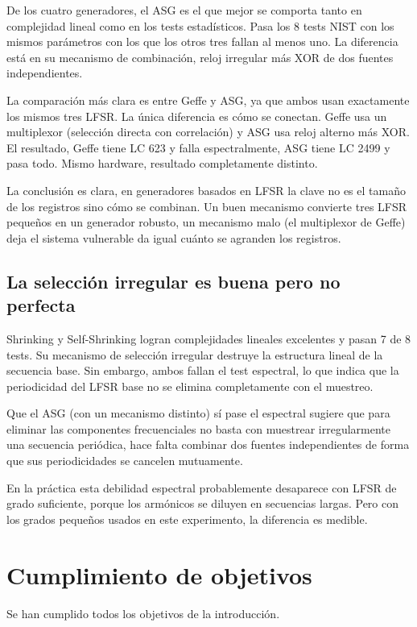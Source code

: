 De los cuatro generadores, el ASG es el que mejor se comporta tanto en complejidad lineal como en los tests estadísticos.
Pasa los 8 tests NIST con los mismos parámetros con los que los otros tres fallan al menos uno.
La diferencia está en su mecanismo de combinación, reloj irregular más XOR de dos fuentes independientes.

La comparación más clara es entre Geffe y ASG, ya que ambos usan exactamente los mismos tres LFSR.
La única diferencia es cómo se conectan. Geffe usa un multiplexor (selección directa con correlación) y ASG usa reloj alterno más XOR.
El resultado, Geffe tiene LC 623 y falla espectralmente, ASG tiene LC 2499 y pasa todo.
Mismo hardware, resultado completamente distinto.

La conclusión es clara, en generadores basados en LFSR la clave no es el tamaño de los registros sino cómo se combinan.
Un buen mecanismo convierte tres LFSR pequeños en un generador robusto, un mecanismo malo (el multiplexor de Geffe) deja el sistema vulnerable
da igual cuánto se agranden los registros.

\subsection{La selección irregular es buena pero no perfecta}

Shrinking y Self-Shrinking logran complejidades lineales excelentes y pasan 7 de 8 tests.
Su mecanismo de selección irregular destruye la estructura lineal de la secuencia base.
Sin embargo, ambos fallan el test espectral, lo que indica que la periodicidad del LFSR base no se elimina completamente con el muestreo.

Que el ASG (con un mecanismo distinto) sí pase el espectral sugiere que para eliminar las componentes frecuenciales
no basta con muestrear irregularmente una secuencia periódica, hace falta combinar dos fuentes independientes de forma que sus periodicidades
se cancelen mutuamente.

En la práctica esta debilidad espectral probablemente desaparece con LFSR de grado suficiente,
porque los armónicos se diluyen en secuencias largas. Pero con los grados pequeños usados en este experimento, la diferencia es medible.

\section{Cumplimiento de objetivos}

Se han cumplido todos los objetivos de la introducción.

